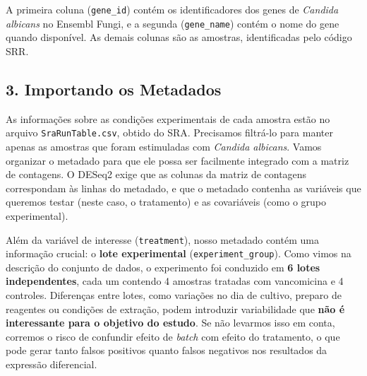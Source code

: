 \documentclass[
  letterpaper,
  DIV=11,
  numbers=noendperiod]{scrreprt}
\begin{document}
A primeira coluna (\texttt{gene\_id}) contém os identificadores dos
genes de \emph{Candida albicans} no Ensembl Fungi, e a segunda
(\texttt{gene\_name}) contém o nome do gene quando disponível. As demais
colunas são as amostras, identificadas pelo código SRR.

\subsection{3. Importando os Metadados}\label{importando-os-metadados}

As informações sobre as condições experimentais de cada amostra estão no
arquivo \texttt{SraRunTable.csv}, obtido do SRA. Precisamos filtrá-lo
para manter apenas as amostras que foram estimuladas com \emph{Candida
albicans}. Vamos organizar o metadado para que ele possa ser facilmente
integrado com a matriz de contagens. O DESeq2 exige que as colunas da
matriz de contagens correspondam às linhas do metadado, e que o metadado
contenha as variáveis que queremos testar (neste caso, o tratamento) e
as covariáveis (como o grupo experimental).

Além da variável de interesse (\texttt{treatment}), nosso metadado
contém uma informação crucial: o \textbf{lote experimental}
(\texttt{experiment\_group}). Como vimos na descrição do conjunto de
dados, o experimento foi conduzido em \textbf{6 lotes independentes},
cada um contendo 4 amostras tratadas com vancomicina e 4 controles.
Diferenças entre lotes, como variações no dia de cultivo, preparo de
reagentes ou condições de extração, podem introduzir variabilidade que
\textbf{não é interessante para o objetivo do estudo}. Se não levarmos
isso em conta, corremos o risco de confundir efeito de \emph{batch} com
efeito do tratamento, o que pode gerar tanto falsos positivos quanto
falsos negativos nos resultados da expressão diferencial.
\end{document}
